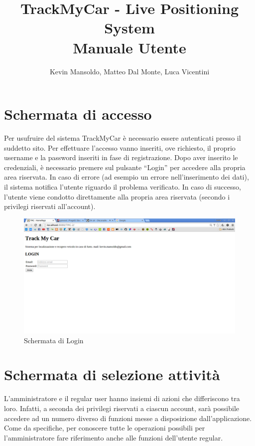 \documentclass[a4paper,12pt]{article}
\begin{document}
\title{\textbf{TrackMyCar - Live Positioning System}\\ Manuale Utente}

\author{Kevin Mansoldo, Matteo Dal Monte, Luca Vicentini}
\date{}
\maketitle
\pagebreak

\tableofcontents
\pagebreak

\section{Schermata di accesso}
Per usufruire del sistema TrackMyCar è necessario essere autenticati presso il suddetto sito. Per effettuare l'accesso vanno inseriti, ove richiesto, il proprio username e la password inseriti in fase di registrazione. Dopo aver inserito le credenziali, è necessario premere sul pulsante ``Login'' per accedere alla propria area riservata. 
In caso di errore (ad esempio un errore nell'inserimento dei dati), il sistema notifica l'utente riguardo il problema verificato. In caso di successo, l'utente viene condotto direttamente alla propria area riservata (secondo i privilegi riservati all'account).

\begin{figure}[htbp]
\centering
\includegraphics[trim={0 10cm 24.4cm 2.3cm}, clip, scale=1]{login.png}
\caption{Schermata di Login \label{fig:login}}
\end{figure}

\section{Schermata di selezione attività}
L'amministratore e il regular user hanno insiemi di azioni che differiscono tra loro. Infatti, a seconda dei privilegi riservati a ciascun account, sarà possibile accedere ad un numero diverso di funzioni messe a disposizione dall'applicazione. Come da specifiche, per conoscere tutte le operazioni possibili per l'amministratore fare riferimento anche alle funzioni dell'utente regular.
\end{document}
